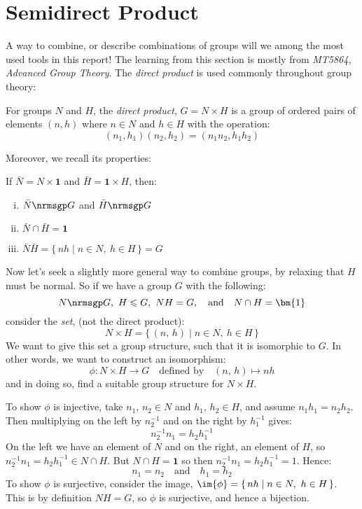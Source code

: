 \section{Semidirect Product}
A way to combine, or describe combinations of groups will we among the most used tools in this report!
The learning from this section is mostly from \textit{MT5864, Advanced Group Theory}.
The \emph{direct product} is used commonly throughout group theory:
\begin{definition}
    \raggedright
    For groups \(N\) and \(H\), the \emph{direct product}, \(G = N\times H\) is a group of ordered pairs of elements
    \((n, h)\) where \(n \in N\) and \(h \in H\) with the operation:
    \[(n_1, h_1)(n_2, h_2) = (n_1n_2, h_1h_2)\]
\end{definition}

Moreover, we recall its properties:
\begin{lemma}
    If \(\bar{N} = N \times \bm{1}\) and \(\bar{H} = \bm{1} \times H\), then:
    \begin{enumerate}[(i)]
        \item \(\bar{N} \nrmsgp G\) and \(\bar{H} \nrmsgp G\)
        \item \(\bar{N} \cap \bar{H} = \bm{1}\)
        \item \(\bar{N}\bar{H} = \{\,nh \mid n \in N,\ h \in H\,\} = G\)
    \end{enumerate}
\end{lemma}

Now let's seek a slightly more general way to combine groups, by relaxing that \(H\) must be normal.
So if we have a group \(G\) with the following:
\[N \nrmsgp G,\ H \leqslant G,\ NH = G, \quad \text{and} \quad N \cap H = \bm{1}\]
consider the \emph{set}, (not the direct product):
\[N \times H = \{\,(n,\,h) \mid n \in N,\ h \in H\,\}\]
We want to give this set a group structure, such that it is isomorphic to \(G\).
In other words, we want to construct an isomorphism:
\[\phi:N \times H \to G \quad \text{defined by} \quad (n,\, h) \mapsto nh\]
and in doing so, find a suitable group structure for \(N {\times} H\).

To show \(\phi\) is injective, take \(n_1,\, n_2 \in N\) and \(h_1,\, h_2 \in H\), and assume \(n_1 h_1 = n_2 h_2\).
Then multiplying on the left by \(n_2^{-1}\) and on the right by \(h_1^{-1}\) gives:
\[n_2^{-1} n_1 = h_2 h_1^{-1}\]
On the left we have an element of \(N\) and on the right, an element of \(H\), so \(n_2^{-1} n_1 = h_2 h_1^{-1} \in N
\cap H\).
But \(N \cap H = \bm{1}\) so then \(n_2^{-1} n_1 = h_2 h_1^{-1} = 1\).
Hence:
\[n_1 = n_2 \quad \text{and} \quad h_1 = h_2\]
To show \(\phi\) is surjective, consider the image, \(\im{\phi} = \{\,nh \mid n \in N,\ h \in H\,\}\).
This is by definition \(NH = G\), so \(\phi\) is surjective, and hence a bijection.

